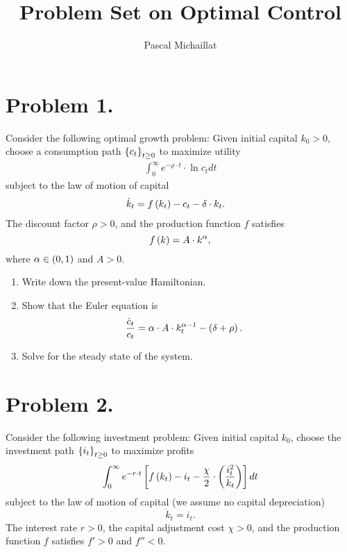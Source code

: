 \documentclass[letterpaper,12pt,leqno]{article}
\begin{document}
\title{Problem Set on Optimal Control}
\author{Pascal Michaillat}
\date{}

\begin{titlepage}
\maketitle
\end{titlepage}

\section*{Problem 1.}

Consider the following optimal growth problem: Given initial capital $k_{0}>0$, choose a consumption path $\left\lbrace c_{t} \right\rbrace_{t\geq 0}$ to maximize utility
\begin{align*}
\int_{0}^{\infty}e^{-\rho\cdot  t} \cdot \ln{c_{t}} dt 
\end{align*}
subject to the law of motion of capital
\begin{align*}
\dot{k}_{t} &=f\left( k_{t} \right) -c_{t}-\delta \cdot k_{t}.
\end{align*}
The discount factor $\rho>0$, and the production function $f$ satisfies
 \[f\left( k \right) =A\cdot k^{\alpha},\]
 where  $\alpha \in \left( 0,1 \right)$ and $A>0$.

\begin{enumerate}
\item Write down the present-value Hamiltonian.
\item Show that the Euler equation is
\begin{align*}
\frac{\dot{c}_{t}}{c_{t}} &=\alpha \cdot  A \cdot k_{t}^{\alpha -1}-\left( \delta +\rho \right).
\end{align*}

\item Solve for the steady state of the system.
\end{enumerate}

\section*{Problem 2.}

Consider the following investment problem: Given initial capital $k_{0}$, choose the investment path $\left\lbrace i_{t} \right\rbrace _{t \geq 0}$ to maximize profits
\begin{align*}
\int_{0}^{\infty} e^{-r\cdot t}\left[ f\left( k_{t} \right) -i_{t}-\frac{\chi}{2}\cdot \left( \frac{i_{t}^{2}}{k_{t}} \right) \right] dt 
\end{align*}
subject to the law of motion of capital (we assume no capital depreciation)
\[\dot{k}_{t} =i_{t}.\]
The interest rate $r>0$, the capital adjustment cost $\chi>0$, and the production function $f$ satisfies $f'>0$ and $f''<0$.
\end{document}
